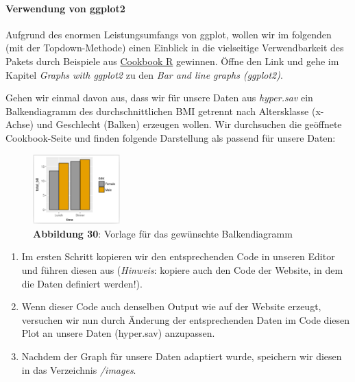\documentclass[]{article}
\providecommand{\tightlist}{%
  \setlength{\itemsep}{0pt}\setlength{\parskip}{0pt}}
\let\oldparagraph\paragraph
\renewcommand{\paragraph}[1]{\oldparagraph{#1}\mbox{}}
\begin{document}
\paragraph{Verwendung von ggplot2}\label{verwendung-von-ggplot2}

Aufgrund des enormen Leistungsumfangs von ggplot, wollen wir im
folgenden (mit der Topdown-Methode) einen Einblick in die vielseitige
Verwendbarkeit des Pakets durch Beispiele aus
\href{http://www.cookbook-r.com/Graphs/}{Cookbook R} gewinnen. Öffne den
Link und gehe im Kapitel \emph{Graphs with ggplot2} zu den \emph{Bar and
line graphs (ggplot2)}.

Gehen wir einmal davon aus, dass wir für unsere Daten aus
\emph{hyper.sav} ein Balkendiagramm des durchschnittlichen BMI getrennt
nach Altersklasse (x-Achse) und Geschlecht (Balken) erzeugen wollen. Wir
durchsuchen die geöffnete Cookbook-Seite und finden folgende Darstellung
als passend für unsere Daten:

\begin{figure}
\centering
\includegraphics[width=0.30000\textwidth]{Images/08_ggplot_Beispiel1.PNG}
\caption{\textbf{Abbildung 30}: Vorlage für das gewünschte
Balkendiagramm}
\end{figure}

\begin{enumerate}
\def\labelenumi{\arabic{enumi}.}
\tightlist
\item
  Im ersten Schritt kopieren wir den entsprechenden Code in unseren
  Editor und führen diesen aus (\emph{Hinweis}: kopiere auch den Code
  der Website, in dem die Daten definiert werden!).
\item
  Wenn dieser Code auch denselben Output wie auf der Website erzeugt,
  versuchen wir nun durch Änderung der entsprechenden Daten im Code
  diesen Plot an unsere Daten (hyper.sav) anzupassen.
\item
  Nachdem der Graph für unsere Daten adaptiert wurde, speichern wir
  diesen in das Verzeichnis \emph{/images}.
\end{enumerate}
\end{document}
